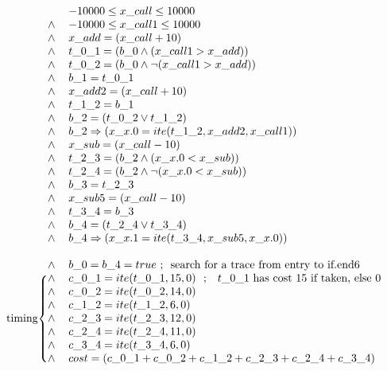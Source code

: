 \documentclass[a4paper,twocolumn,11pt]{article}
\begin{document}
\begin{figure*}
	\small
$$
\begin{blockarray}{ll}
  & -10000 \leq x\_call	\leq 10000 \\
 \wedge & -10000 \leq x\_call1\leq 10000 \\
 \wedge & x\_add = (x\_call + 10) \\
 \wedge & t\_0\_1 = (b\_0 \wedge (x\_call1 > x\_add)) \\
 \wedge & t\_0\_2 = (b\_0 \wedge \neg(x\_call1 > x\_add)) \\
 \wedge & b\_1 = t\_0\_1 \\
 \wedge & x\_add2 = (x\_call + 10) \\
 \wedge & t\_1\_2 = b\_1 \\
 \wedge & b\_2 = (t\_0\_2 \vee t\_1\_2) \\
 \wedge & b\_2 \Rightarrow (x\_x.0 = ite(t\_1\_2,x\_add2,x\_call1)) \\
 \wedge & x\_sub = (x\_call - 10) \\
 \wedge & t\_2\_3 = (b\_2 \wedge (x\_x.0 < x\_sub)) \\
 \wedge & t\_2\_4 = (b\_2 \wedge \neg(x\_x.0 < x\_sub)) \\
 \wedge & b\_3 = t\_2\_3 \\
 \wedge & x\_sub5 = (x\_call - 10) \\
 \wedge & t\_3\_4 = b\_3 \\
 \wedge & b\_4 = (t\_2\_4 \vee t\_3\_4) \\
 \wedge & b\_4 \Rightarrow (x\_x.1 = ite(t\_3\_4,x\_sub5,x\_x.0)) \\
  & \\
  \wedge & b\_0 = b\_4 = true \textnormal{~;~ search for a trace from entry to if.end6}\\
 \begin{block}{\Left{\rotatebox{90}{timing}}{\{}ll}
	 \wedge & c\_0\_1 = ite(t\_0\_1,15,0) \textnormal{~ ; ~ $t\_0\_1$ has cost 15 if taken, else 0} \\
 \wedge & c\_0\_2 = ite(t\_0\_2,14,0)\\
 \wedge & c\_1\_2 = ite(t\_1\_2,6,0)\\
 \wedge & c\_2\_3 = ite(t\_2\_3,12,0)\\
 \wedge & c\_2\_4 = ite(t\_2\_4,11,0)\\
 \wedge & c\_3\_4 = ite(t\_3\_4,6,0)\\
 \wedge & cost = (c\_0\_1 + c\_0\_2 + c\_1\_2 + c\_2\_3 + c\_2\_4 + c\_3\_4) \\
 \end{block}

\end{blockarray}$$
\end{figure*}
\end{document}
